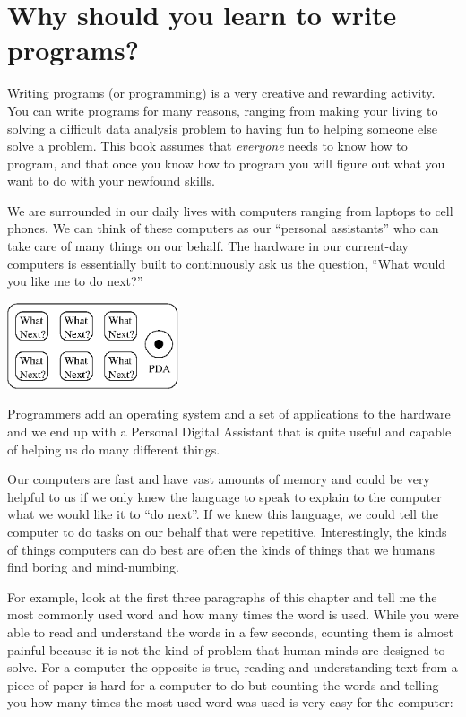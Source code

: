 
\chapter{Why should you learn to write programs?}

Writing programs (or programming) is a very creative 
and rewarding activity.  You can write programs for 
many reasons, ranging from making your living to solving
a difficult data analysis problem to having fun to helping
someone else solve a problem.  This book assumes that 
\emph{everyone} needs to know how to program, and that once 
you know how to program you will figure out what you want 
to do with your newfound skills.  

We are surrounded in our daily lives with computers ranging 
from laptops to cell phones.  We can think of these computers
as our ``personal assistants'' who can take care of many things
on our behalf.  The hardware in our current-day computers 
is essentially built to continuously ask us the question, 
``What would you like me to do next?''

\beforefig
\centerline{\includegraphics[height=1.00in]{figs2/pda.eps}}
\afterfig

Programmers add an operating system and a set of applications
to the hardware and we end up with a Personal Digital
Assistant that is quite useful and capable of helping
us do many different things.

Our computers are fast and have vast amounts of memory and 
could be very helpful to us if we only knew the language to
speak to explain to the computer what we would like it to 
``do next''.  If we knew this language, we could tell the 
computer to do tasks on our behalf that were repetitive.  
Interestingly, the kinds of things computers can do best
are often the kinds of things that we humans find boring
and mind-numbing.

For example, look at the first three paragraphs of this
chapter and tell me the most commonly used word and how
many times the word is used.  While you were able to read
and understand the words in a few seconds, counting them
is almost painful because it is not the kind of problem 
that human minds are designed to solve.  For a computer
the opposite is true, reading and understanding text 
from a piece of paper is hard for a computer to do 
but counting the words and telling you how many times
the most used word was used is very easy for the
computer:

